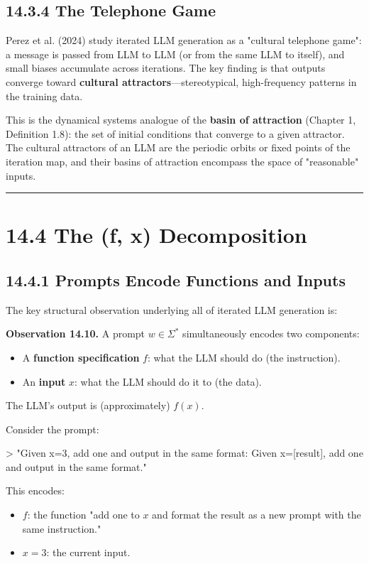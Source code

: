\subsection{14.3.4 The Telephone Game}

Perez et al. (2024) study iterated LLM generation as a "cultural telephone game": a message is passed from LLM to LLM (or from the same LLM to itself), and small biases accumulate across iterations. The key finding is that outputs converge toward \textbf{cultural attractors}---stereotypical, high-frequency patterns in the training data.

This is the dynamical systems analogue of the \textbf{basin of attraction} (Chapter 1, Definition 1.8): the set of initial conditions that converge to a given attractor. The cultural attractors of an LLM are the periodic orbits or fixed points of the iteration map, and their basins of attraction encompass the space of "reasonable" inputs.

\bigskip\hrule\bigskip

\section{14.4 The (f, x) Decomposition}

\subsection{14.4.1 Prompts Encode Functions and Inputs}

The key structural observation underlying all of iterated LLM generation is:

\textbf{Observation 14.10.} A prompt $w \in \Sigma^*$ simultaneously encodes two components:
\begin{itemize}
  \item A \textbf{function specification} $f$: what the LLM should do (the instruction).
  \item An \textbf{input} $x$: what the LLM should do it to (the data).
\end{itemize}

The LLM's output is (approximately) $f(x)$.

\begin{example}
Consider the prompt:

> "Given x=3, add one and output in the same format: Given x=[result], add one and output in the same format."

This encodes:
\end{example}
\begin{itemize}
  \item $f$: the function "add one to $x$ and format the result as a new prompt with the same instruction."
  \item $x = 3$: the current input.
\end{itemize}

